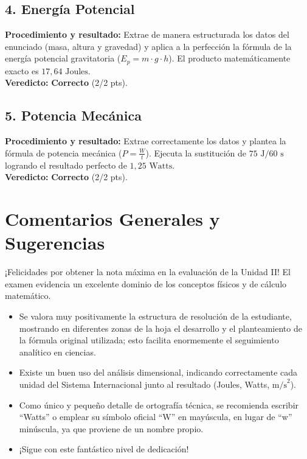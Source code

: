 \documentclass[12pt,letterpaper]{article}
\begin{document}
\subsection*{4. Energía Potencial}
\textbf{Procedimiento y resultado:} Extrae de manera estructurada los datos del enunciado (masa, altura y gravedad) y aplica a la perfección la fórmula de la energía potencial gravitatoria ($E_p = m \cdot g \cdot h$). El producto matemáticamente exacto es $17,64 \text{ Joules}$. \\
\textbf{Veredicto:} \textbf{Correcto} (2/2 pts).

\subsection*{5. Potencia Mecánica}
\textbf{Procedimiento y resultado:} Extrae correctamente los datos y plantea la fórmula de potencia mecánica ($P = \frac{W}{t}$). Ejecuta la sustitución de $75 \text{ J} / 60 \text{ s}$ logrando el resultado perfecto de $1,25 \text{ Watts}$. \\
\textbf{Veredicto:} \textbf{Correcto} (2/2 pts).

\vspace{0.5cm}
\section*{Comentarios Generales y Sugerencias}
¡Felicidades por obtener la nota máxima en la evaluación de la Unidad II! El examen evidencia un excelente dominio de los conceptos físicos y de cálculo matemático.
\begin{itemize}
    \item Se valora muy positivamente la estructura de resolución de la estudiante, mostrando en diferentes zonas de la hoja el desarrollo y el planteamiento de la fórmula original utilizada; esto facilita enormemente el seguimiento analítico en ciencias.
    \item Existe un buen uso del análisis dimensional, indicando correctamente cada unidad del Sistema Internacional junto al resultado (Joules, Watts, $\text{m/s}^2$).
    \item Como único y pequeño detalle de ortografía técnica, se recomienda escribir ``Watts'' o emplear su símbolo oficial ``W'' en mayúscula, en lugar de ``w'' minúscula, ya que proviene de un nombre propio.
    \item ¡Sigue con este fantástico nivel de dedicación!
\end{itemize}
\end{document}
